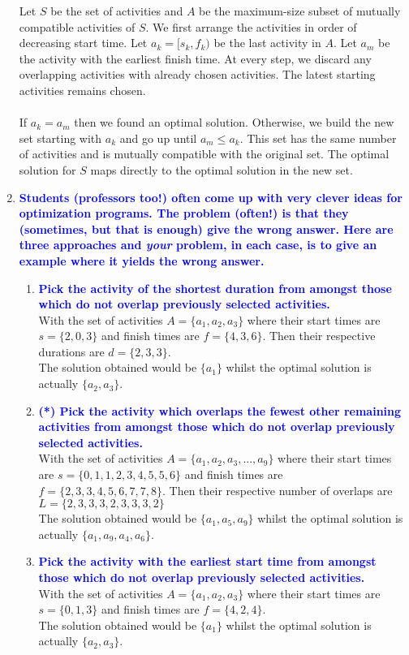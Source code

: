 \documentclass[11pt]{article}
\begin{document}
\begin{enumerate}
\begin{itemize}
    \end{itemize}
    Let $S$ be the set of activities and $A$ be the maximum-size subset of mutually compatible activities of $S$. We first arrange the activities in order of decreasing start time. Let $a_k = [s_k, f_k)$ be the last activity in $A$. Let $a_m$ be the activity with the earliest finish time. At every step, we discard any overlapping activities with already chosen activities. The latest starting activities remains chosen.
    \\\\ If $a_k = a_m$ then we found an optimal solution. Otherwise, we build the new set starting with $a_k$ and go up until $a_m \leq a_k$. This set has the same number of activities and is mutually compatible with the original set. The optimal solution for $S$ maps directly to the optimal solution in the new set.    

\item \textbf{\textcolor{blue}{Students (professors too!) often come up with very clever ideas for
optimization programs.  The problem (often!) is that they (sometimes, but that
is enough) give the wrong answer.  Here are three approaches and {\em your} problem,
in each case, is to give an example where it yields the wrong answer.}}
    \begin{enumerate}
    \item \textbf{\textcolor{blue}{Pick the activity of the shortest duration 
    from amongst those which do not overlap previously selected activities.}}
        \\ With the set of activities $A = \{a_1, a_2, a_3\}$ where their start times are $s = \{2, 0, 3\}$ and finish times are $f = \{4, 3, 6\}$. Then their respective durations are $d = \{2, 3, 3\}$.
        \\ The solution obtained would be $\{a_1\}$ whilst the optimal solution is actually $\{a_2, a_3\}$.
    \item \textbf{\textcolor{blue}{(*) Pick the activity which overlaps the fewest other remaining activities
    from amongst those which do not overlap previously selected activities.}}
        \\ With the set of activities $A = \{a_1, a_2, a_3, ..., a_9\}$ where their start times are $s = \{0, 1, 1, 2, 3, 4, 5, 5, 6\}$ and finish times are $f = \{2, 3, 3, 4, 5, 6, 7, 7, 8\}$. Then their respective number of overlaps are $L = \{2, 3, 3, 3, 2, 3, 3, 3, 2\}$
        \\ The solution obtained would be $\{a_1, a_5, a_9\}$ whilst the optimal solution is actually $\{a_1, a_9, a_4, a_6\}$.
    \item \textbf{\textcolor{blue}{Pick the activity with the earliest start time
    from amongst those which do not overlap previously selected activities.}}
        \\ With the set of activities $A = \{a_1, a_2, a_3\}$ where their start times are $s = \{0, 1, 3\}$ and finish times are $f = \{4, 2, 4\}$.
        \\ The solution obtained would be $\{a_1\}$ whilst the optimal solution is actually $\{a_2, a_3\}$.
    \end{enumerate}
\end{enumerate}
\end{document}
